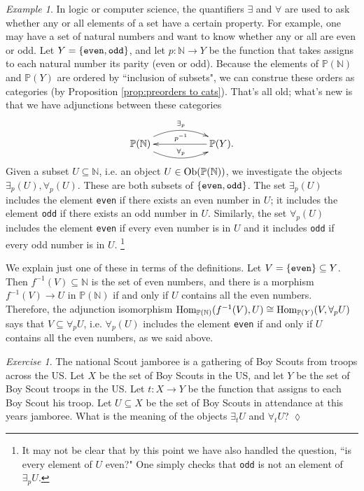 \documentclass{book}
\def\tn{\textnormal}
\def\PP{{\mathbb P}}
\def\NN{{\mathbb N}}
\def\Hom{\tn{Hom}}
\def\Ob{\tn{Ob}}
\def\to{\rightarrow}
\def\taking{\colon}
\def\ss{\subseteq}
\def\iso{\cong}
\def\m1{{-1}}
\theoremstyle{remark}
\newtheorem{example}[subsubsection]{Example}
\newtheorem{exc}[subsubsection]{Exercise}
\newenvironment{exercise}{\begin{exc}}{\hspace*{\fill}$\lozenge$\end{exc}}
\theoremstyle{definition}
\begin{document}
\begin{example}

In logic or computer science, the quantifiers $\exists$ and $\forall$ are used to ask whether any or all elements of a set have a certain property. For example, one may have a set of natural numbers and want to know whether any or all are even or odd.
Let $Y=\{{\tt even,odd}\}$, and let $p\taking\NN\to Y$ be the function that takes assigns to each natural number its parity (even or odd). Because the elements of $\PP(\NN)$ and $\PP(Y)$ are ordered by ``inclusion of subsets", we can construe these orders as categories (by Proposition \ref{prop:preorders to cats}). That's all old; what's new is that we have adjunctions between these categories
$$
\xymatrix{\PP(\NN)\ar@/^1.2pc/[rr]^{\exists_p}\ar@/_1.2pc/[rr]^{\forall_p}&&\PP(Y)\ar[ll]_{p^\m1}.}
$$
Given a subset $U\ss\NN$, i.e. an object $U\in\Ob(\PP(\NN))$, we investigate the objects $\exists_p(U),\forall_p(U)$. These are both subsets of $\{{\tt even,odd}\}$. The set $\exists_p(U)$ includes the element {\tt even} if there exists an even number in $U$; it includes the element {\tt odd} if there exists an odd number in $U$. Similarly, the set $\forall_p(U)$ includes the element {\tt even} if every even number is in $U$ and it includes {\tt odd} if every odd number is in $U$.
\footnote{It may not be clear that by this point we have also handled the question, ``is every element of $U$ even?" One simply checks that {\tt odd} is not an element of $\exists_pU$.}

We explain just one of these in terms of the definitions. Let $V=\{{\tt even}\}\ss Y$. Then $f^\m1(V)\ss\NN$ is the set of even numbers, and there is a morphism $f^\m1(V)\to U$ in $\PP(\NN)$ if and only if $U$ contains all the even numbers. Therefore, the adjunction isomorphism $\Hom_{\PP(\NN)}(f^\m1(V),U)\iso\Hom_{\PP(Y)}(V,\forall_pU)$ says that $V\ss\forall_pU$, i.e. $\forall_p(U)$ includes the element {\tt even} if and only if $U$ contains all the even numbers, as we said above.

\end{example}

\begin{exercise}
The national Scout jamboree is a gathering of Boy Scouts from troops across the US. Let $X$ be the set of Boy Scouts in the US, and let $Y$ be the set of Boy Scout troops in the US. Let $t\taking X\to Y$ be the function that assigns to each Boy Scout his troop. Let $U\ss X$ be the set of Boy Scouts in attendance at this years jamboree. What is the meaning of the objects $\exists_tU$ and $\forall_tU$?
\end{exercise}
\end{document}
